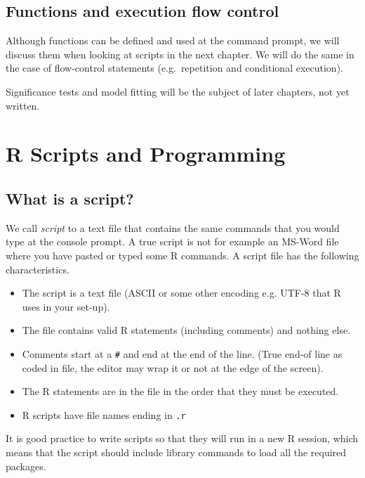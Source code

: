 \documentclass[paper=a4,10pt,div=17,headsepline,BCOR=12mm,twoside,open=right]{scrbook}\usepackage{knitr}
\begin{document}
\section{Functions and execution flow control}

Although functions can be defined and used at the command prompt, we will discuss them when looking at scripts in the next chapter. We will do the same in the case of flow-control statements (e.g.\ repetition and conditional execution).

Significance tests and model fitting will be the subject of later chapters, not yet written.







\chapter{R Scripts and Programming}\label{chap:R:scripts}

\section{What is a script?}

We call \textit{script} to a text file that contains the same commands that you would type at the console prompt. A true script is not for example an MS-Word file where you have pasted or typed some R commands. A script file has the following characteristics.
\begin{itemize}
  \item The script is a text file (ASCII or some other encoding e.g. UTF-8 that R uses in your set-up).
  \item The file contains valid R statements (including comments) and nothing else.
  \item Comments start at a \texttt{\#} and end at the end of the line. (True end-of line as coded in file, the editor may wrap it or not at the edge of the screen).
  \item The R statements are in the file in the order that they must be executed.
  \item R scripts have file names ending in \texttt{.r}
\end{itemize}

It is good practice to write scripts so that they will run in a new R session, which means that the script should include library commands to load all the required packages.
\end{document}
